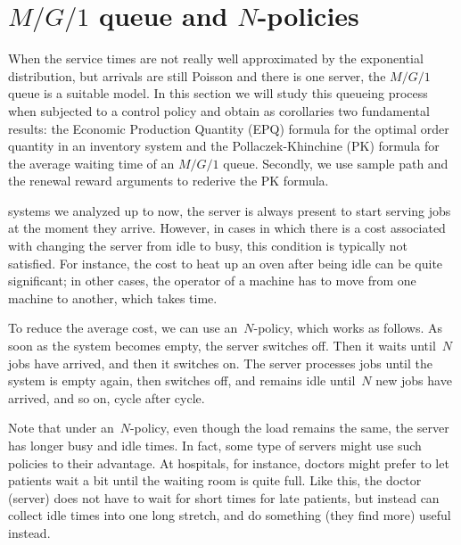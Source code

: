 \documentclass[stochastic-or.tex]{subfiles}
\begin{document}
\section{\texorpdfstring{$M/G/1$}{MG1} queue and \texorpdfstring{$N$}{N}-policies}
\label{sec:n-policies-mg1}



When the service times are not really well approximated by the exponential distribution, but arrivals are still Poisson and there is one server, the $M/G/1$ queue is a suitable model.
In this section we will study this queueing process when subjected to a control policy and obtain as corollaries two fundamental results: the Economic Production Quantity (EPQ) formula for the optimal order quantity in an inventory system and the Pollaczek-Khinchine (PK) formula for the average waiting time of an $M/G/1$ queue.
Secondly, we use sample path and the renewal reward arguments to rederive the PK formula.



 systems we analyzed up to now, the server is always present to start serving jobs at the moment they arrive.
However, in cases in which there is a cost associated with changing the server from idle to busy, this condition is typically not satisfied.
For instance, the cost to heat up an oven after being idle can be quite significant; in other cases, the operator of a machine has to move from one machine to another, which takes time.



To reduce the average cost, we can use an~$N$-policy, which works as follows.
As soon as the system becomes empty, the server switches off.
Then it waits until~$N$ jobs have arrived, and then it switches on.
The server processes jobs until the system is empty again, then switches off, and remains idle until~$N$ new jobs have arrived, and so on, cycle after cycle.

Note that under an~$N$-policy, even though the load remains the same, the server has longer busy and idle times.
In fact, some type of servers might use such policies to their advantage.
At hospitals, for instance, doctors might prefer to let patients wait a bit until the waiting room is quite full.
Like this, the doctor (server) does not have to wait for short times for late patients, but instead can collect idle times into one long stretch, and do something (they find more) useful instead.
\end{document}
